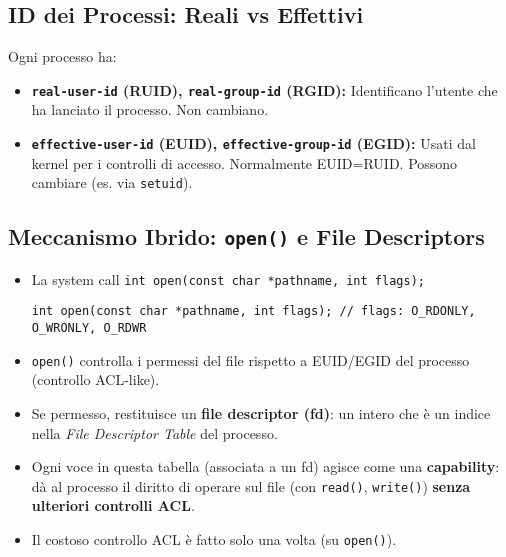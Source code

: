 \subsection{ID dei Processi: Reali vs Effettivi}
Ogni processo ha:
\begin{itemize}
    \item \textbf{\texttt{real-user-id} (RUID), \texttt{real-group-id} (RGID):} Identificano l'utente che ha lanciato il processo. Non cambiano.
    \item \textbf{\texttt{effective-user-id} (EUID), \texttt{effective-group-id} (EGID):} Usati dal kernel per i controlli di accesso. Normalmente EUID=RUID. Possono cambiare (es. via \texttt{setuid}).
\end{itemize}

\subsection{Meccanismo Ibrido: \texttt{open()} e File Descriptors}
\begin{itemize}
    \item La system call \texttt{int open(const char *pathname, int flags);}
    \begin{verbatim}
int open(const char *pathname, int flags); // flags: O_RDONLY, O_WRONLY, O_RDWR
    \end{verbatim}
    \item \texttt{open()} controlla i permessi del file rispetto a EUID/EGID del processo (controllo ACL-like).
    \item Se permesso, restituisce un \textbf{file descriptor (fd)}: un intero che è un indice nella \textit{File Descriptor Table} del processo.
    \item Ogni voce in questa tabella (associata a un fd) agisce come una \textbf{capability}: dà al processo il diritto di operare sul file (con \texttt{read()}, \texttt{write()}) \textbf{senza ulteriori controlli ACL}.
    \item Il costoso controllo ACL è fatto solo una volta (su \texttt{open()}).
\end{itemize}
